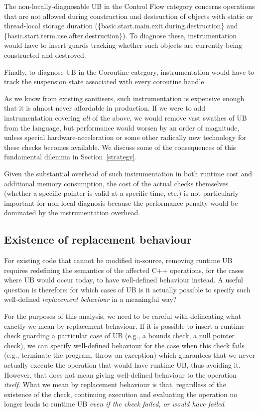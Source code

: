 The non-locally-diagnosable UB in the Control Flow category concerns operations that are not allowed during construction and destruction of objects with static or thread-local storage duration (\{basic.start.main.exit.during.destruction\} and \{basic.start.term.use.after.destruction\}). To diagnose these, instrumentation would have to insert guards tracking whether such objects are currently being constructed and destroyed.  

Finally, to diagnose UB in the Coroutine category, instrumentation would have to track the suspension state associated with every coroutine handle.

As we know from existing sanitisers, such instrumentation is expensive enough that it is almost never affordable in production. If we were to add instrumentation covering \emph{all} of the above, we would remove vast swathes of UB from the language, but performance would worsen by an order of magnitude, unless special hardware-acceleration or some other radically new technology for these checks becomes available. We discuss some of the consequences of this fundamental dilemma in Section~\ref{strategy}. %

Given the substantial overhead of such instrumentation in both runtime cost and additional memory consumption, the cost of the actual checks themselves (whether a specific pointer is valid at a specific time, etc.) is not particularly important for non-local diagnosis because the performance penalty would be dominated by the instrumentation overhead.

\subsection{Existence of replacement behaviour}
\label{replacement}


For existing code that cannot be modified in-source, removing runtime UB requires redefining 
the semantics of the affected C++ operations, for the cases where UB would occur today, to have well-defined behaviour instead. A useful question is therefore: for which cases of UB is it actually possible to  specify such well-defined \emph{replacement behaviour} in a meaningful way?

For the purposes of this analysis, we need to be careful with delineating what exactly we mean by replacement behaviour. If it is possible to insert a runtime check guarding a particular case of UB (e.g., a bounds check, a null pointer check), we can specify well-defined behaviour for the case when this check fails (e.g., terminate the program, throw an exception) which guarantees that we never actually execute the operation that would have runtime UB, thus avoiding it. However, that does not mean giving well-defined behaviour to the operation \emph{itself}. What we mean by replacement behaviour is that, regardless of the existence of the check, continuing execution and evaluating the operation no longer leads to runtime UB \emph{even if the check failed, or would have failed}.


